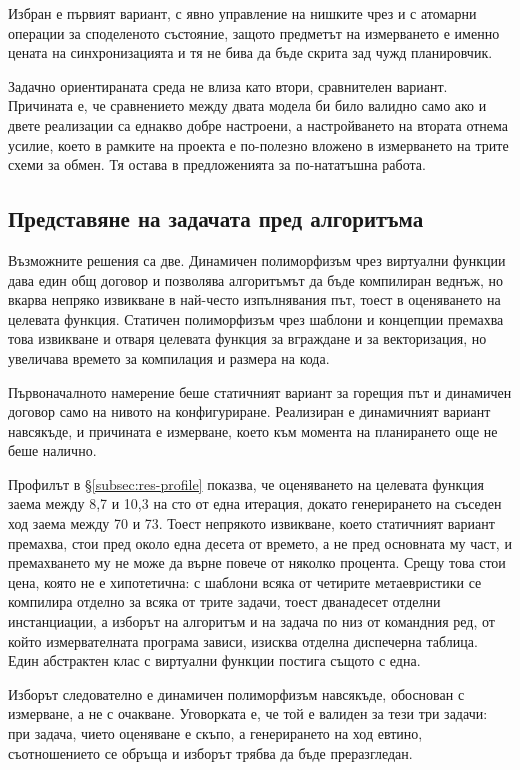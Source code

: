 Избран е първият вариант, с явно управление на нишките чрез  и с
атомарни операции за споделеното състояние, защото предметът на измерването е именно
цената на синхронизацията и тя не бива да бъде скрита зад чужд планировчик.

Задачно ориентираната среда не влиза като втори, сравнителен вариант. Причината е, че
сравнението между двата модела би било валидно само ако и двете реализации са еднакво
добре настроени, а настройването на втората отнема усилие, което в рамките на проекта
е по-полезно вложено в измерването на трите схеми за обмен. Тя остава в предложенията
за по-нататъшна работа.

\subsection{Представяне на задачата пред алгоритъма}
\label{subsec:alt-problem}

Възможните решения са две. Динамичен полиморфизъм чрез виртуални функции дава един
общ договор и позволява алгоритъмът да бъде компилиран веднъж, но вкарва непряко
извикване в най-често изпълнявания път, тоест в оценяването на целевата функция.
Статичен полиморфизъм чрез шаблони и концепции премахва това извикване и отваря
целевата функция за вграждане и за векторизация, но увеличава времето за компилация и
размера на кода.

Първоначалното намерение беше статичният вариант за горещия път и динамичен договор
само на нивото на конфигуриране. Реализиран е динамичният вариант навсякъде, и
причината е измерване, което към момента на планирането още не беше налично.

Профилът в §\ref{subsec:res-profile} показва, че оценяването на целевата функция заема
между 8,7 и 10,3 на сто от една итерация, докато генерирането на съседен ход заема
между 70 и 73. Тоест непрякото извикване, което статичният вариант премахва, стои пред
около една десета от времето, а не пред основната му част, и премахването му не може да
върне повече от няколко процента. Срещу това стои цена, която не е хипотетична: с
шаблони всяка от четирите метаевристики се компилира отделно за всяка от трите задачи,
тоест дванадесет отделни инстанциации, а изборът на алгоритъм и на задача по низ от
командния ред, от който измервателната програма зависи, изисква отделна диспечерна
таблица. Един абстрактен клас с виртуални функции постига същото с една.

Изборът следователно е динамичен полиморфизъм навсякъде, обоснован с измерване, а не с
очакване. Уговорката е, че той е валиден за тези три задачи: при задача, чието
оценяване е скъпо, а генерирането на ход евтино, съотношението се обръща и изборът
трябва да бъде преразгледан.

